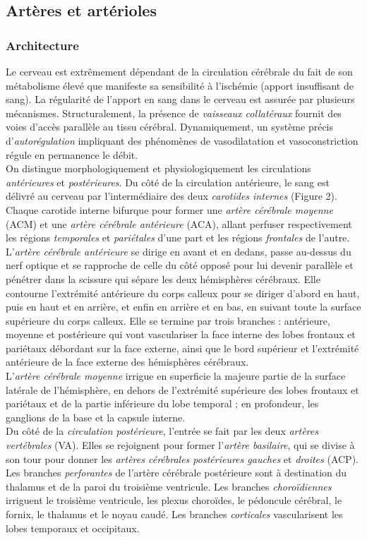 \subsection{Artères et artérioles}
\subsubsection{Architecture}
Le cerveau est extrêmement dépendant de la circulation cérébrale du fait de son métabolisme élevé que manifeste sa sensibilité à l’ischémie (apport insuffisant de sang). La régularité de l’apport en sang dans le cerveau est assurée par plusieurs mécanismes. Structuralement, la présence de {\em vaisseaux collatéraux} fournit des voies d’accès parallèle au tissu cérébral. Dynamiquement, un système précis d’{\em autorégulation}  impliquant des phénomènes de vasodilatation et vasoconstriction régule en permanence le débit.\\
On distingue morphologiquement et physiologiquement les circulations {\em antérieures} et {\em postérieures}. Du côté de la circulation antérieure, le sang est délivré au cerveau par l’intermédiaire des deux {\em carotides internes} (Figure 2). Chaque carotide interne bifurque pour former une {\em artère cérébrale moyenne} (ACM) et une {\em artère cérébrale antérieure} (ACA), allant perfuser respectivement les régions {\em temporales} et {\em pariétales} d’une part et les régions {\em frontales} de l’autre. \\
L’{\em artère cérébrale antérieure} se dirige en avant et en dedans, passe au-dessus du nerf optique et se rapproche de celle du côté opposé pour lui devenir parallèle et pénétrer dans la scissure qui sépare les deux hémisphères cérébraux. Elle contourne l'extrémité antérieure du corps calleux pour se diriger d'abord en haut, puis en haut et en arrière, et enfin en arrière et en bas, en suivant toute la surface supérieure du corps calleux. Elle se termine par trois branches : antérieure, moyenne et postérieure qui vont vasculariser la face interne des lobes frontaux et pariétaux débordant sur la face externe, ainsi que le bord supérieur et l'extrémité antérieure de la face externe des hémisphères cérébraux.\\
L'{\em artère cérébrale moyenne} irrigue en superficie la majeure partie de la surface latérale de l'hémisphère, en dehors de l'extrémité supérieure des lobes frontaux et pariétaux et de la partie inférieure du lobe temporal ; en profondeur, les ganglions de la base et la capsule interne.\\
Du côté de la {\em circulation postérieure}, l’entrée se fait par les deux {\em artères vertébrales} (VA). Elles se rejoignent pour former l’{\em artère basilaire}, qui se divise à son tour pour donner les {\em artères cérébrales postérieures gauches} et {\em droites} (ACP). Les branches {\em perforantes} de l'artère cérébrale postérieure sont à destination du thalamus et de la paroi du troisième ventricule. Les branches {\em choroïdiennes} irriguent le troisième ventricule, les plexus choroïdes, le pédoncule cérébral, le fornix, le thalamus et le noyau caudé. Les branches {\em corticales} vascularisent les lobes temporaux et occipitaux.\\
